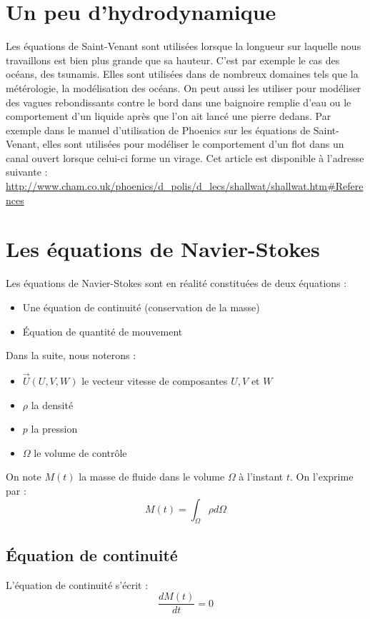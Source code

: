 
\section{Un peu d'hydrodynamique}
Les équations de Saint-Venant sont utilisées lorsque la longueur sur laquelle nous travaillons est bien plus grande que sa hauteur. C'est par exemple le cas des océans, des tsunamis. Elles sont utilisées dans de nombreux domaines tels que la métérologie, la modélisation des océans. On peut aussi les utiliser pour modéliser des vagues rebondissants contre le bord dans une baignoire remplie d'eau ou le comportement d'un liquide après que l'on ait lancé une pierre dedans. Par exemple dans le manuel d'utilisation de Phoenics sur les équations de Saint-Venant, elles sont utilisées pour modéliser le comportement d'un flot dans un canal ouvert lorsque celui-ci forme un virage. Cet article est disponible à l'adresse suivante : \url{http://www.cham.co.uk/phoenics/d_polis/d_lecs/shallwat/shallwat.htm#References} \\
\section{Les équations de Navier-Stokes}
Les équations de Navier-Stokes sont en réalité constituées de deux équations :
\begin{itemize}
	\item Une équation de continuité (conservation de la masse)
	\item Équation de quantité de mouvement
\end{itemize}

\bigskip
Dans la suite, nous noterons :
\begin{itemize}
	\item $\overrightarrow{U}(U,V,W)$ le vecteur vitesse de composantes $U, V$ et $W$
	\item $\rho$ la densité
	\item $p$ la pression
	\item $\Omega$ le volume de contrôle
\end{itemize}

\bigskip
On note $M(t)$ la masse de fluide dans le volume $\Omega$ à l'instant $t$. On l'exprime par :
	\begin{equation} \label{II-2} M(t)=\int_{\Omega} \rho d\Omega \end{equation}

	\subsection{Équation de continuité}
L'équation de continuité s'écrit :
	\begin{equation} \label{II-2-1-1} \frac{d M(t)}{dt}=0 \end{equation}

